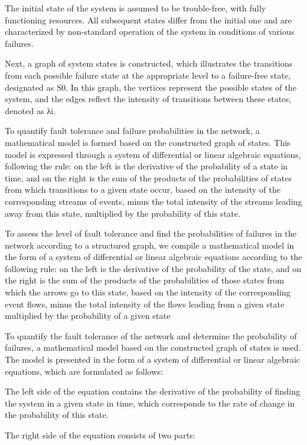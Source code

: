 The initial state of the system is assumed to be trouble-free, with
fully functioning resources. All subsequent states differ from the
initial one and are characterized by non-standard operation of the
system in conditions of various failures.

Next, a graph of system states is constructed, which illustrates the
transitions from each possible failure state at the appropriate level to
a failure-free state, designated as S0. In this graph, the vertices
represent the possible states of the system, and the edges reflect the
intensity of transitions between these states, denoted as λi.

To quantify fault tolerance and failure probabilities in the network, a
mathematical model is formed based on the constructed graph of states.
This model is expressed through a system of differential or linear
algebraic equations, following the rule: on the left is the derivative
of the probability of a state in time, and on the right is the sum of
the products of the probabilities of states from which transitions to a
given state occur, based on the intensity of the corresponding streams
of events, minus the total intensity of the streams leading away from
this state, multiplied by the probability of this state.

To assess the level of fault tolerance and find the probabilities of
failures in the network according to a structured graph, we compile a
mathematical model in the form of a system of differential or linear
algebraic equations according to the following rule: on the left is the
derivative of the probability of the state, and on the right is the sum
of the products of the probabilities of those states from which the
arrows go to this state, based on the intensity of the corresponding
event flows, minus the total intensity of the flows leading from a given
state multiplied by the probability of a given state

To quantify the fault tolerance of the network and determine the
probability of failures, a mathematical model based on the constructed
graph of states is used. The model is presented in the form of a system
of differential or linear algebraic equations, which are formulated as
follows:

The left side of the equation contains the derivative of the probability
of finding the system in a given state in time, which corresponds to the
rate of change in the probability of this state.

The right side of the equation consists of two parts:

